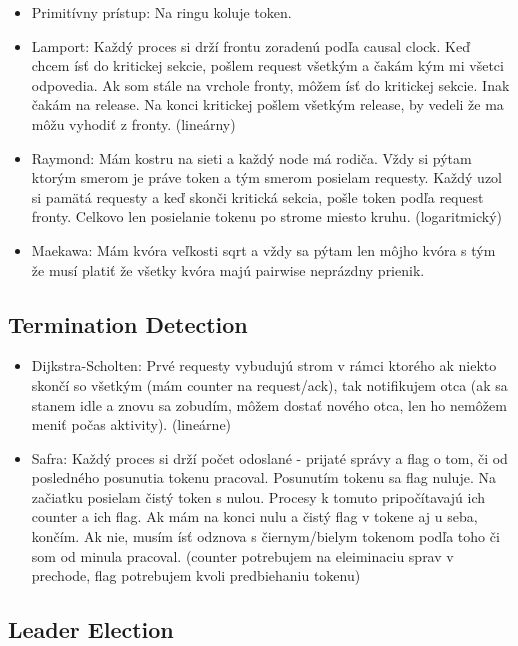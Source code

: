 \documentclass[paper=a4, fontsize=11pt]{scrartcl} %
\numberwithin{equation}{section} %
\numberwithin{figure}{section} %
\numberwithin{table}{section} %
\begin{document}
	\begin{itemize}
		\item Primitívny prístup: Na ringu koluje token.
		\item Lamport: Každý proces si drží frontu zoradenú podľa causal clock. Keď chcem ísť do kritickej sekcie, pošlem request všetkým a čakám kým mi všetci odpovedia. Ak som stále na vrchole fronty, môžem ísť do kritickej sekcie. Inak čakám na release. Na konci kritickej pošlem všetkým release, by vedeli že ma môžu vyhodiť z fronty. (lineárny)
		\item Raymond: Mám kostru na sieti a každý node má rodiča. Vždy si pýtam ktorým smerom je práve token a tým smerom posielam requesty. Každý uzol si pamätá requesty a keď skonči kritická sekcia, pošle token podľa request fronty. Celkovo len posielanie tokenu po strome miesto kruhu. (logaritmický)
		\item Maekawa: Mám kvóra veľkosti sqrt a vždy sa pýtam len môjho kvóra s tým že musí platiť že všetky kvóra majú pairwise neprázdny prienik.
	\end{itemize}
	
	\subsection{Termination Detection}
	
	\begin{itemize}
		\item Dijkstra-Scholten: Prvé requesty vybudujú strom v rámci ktorého ak niekto skončí so všetkým (mám counter na request/ack), tak notifikujem otca (ak sa stanem idle a znovu sa zobudím, môžem dostať nového otca, len ho nemôžem meniť počas aktivity). (lineárne)
		\item Safra: Každý proces si drží počet odoslané - prijaté správy a flag o tom, či od posledného posunutia tokenu pracoval. Posunutím tokenu sa flag nuluje. Na začiatku posielam čistý token s nulou. Procesy k tomuto pripočítavajú ich counter a ich flag. Ak mám na konci nulu a čistý flag v tokene aj u seba, končím. Ak nie, musím ísť odznova s čiernym/bielym tokenom podľa toho či som od minula pracoval. (counter potrebujem na eleiminaciu sprav v prechode, flag potrebujem kvoli predbiehaniu tokenu)
	\end{itemize}
	
	\subsection{Leader Election}
	
\end{document}
